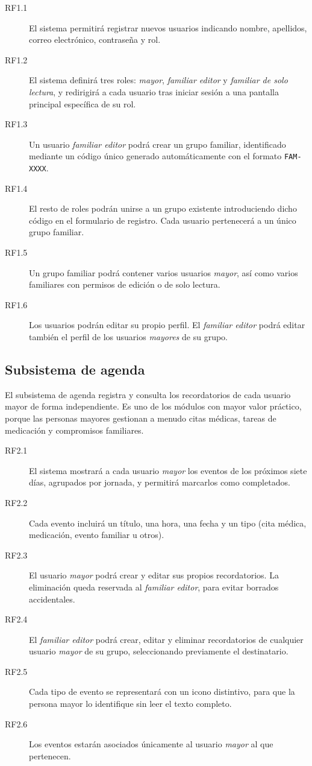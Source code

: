 \begin{description}
  \item[RF1.1] El sistema permitirá registrar nuevos usuarios indicando
  nombre, apellidos, correo electrónico, contraseña y rol.
  \item[RF1.2] El sistema definirá tres roles: \emph{mayor}, \emph{familiar
  editor} y \emph{familiar de solo lectura}, y redirigirá a cada usuario
  tras iniciar sesión a una pantalla principal específica de su rol.
  \item[RF1.3] Un usuario \emph{familiar editor} podrá crear un grupo
  familiar, identificado mediante un código único generado
  automáticamente con el formato \texttt{FAM-XXXX}.
  \item[RF1.4] El resto de roles podrán unirse a un grupo existente
  introduciendo dicho código en el formulario de registro. Cada usuario
  pertenecerá a un único grupo familiar.
  \item[RF1.5] Un grupo familiar podrá contener varios usuarios \emph{mayor},
  así como varios familiares con permisos de edición o de solo lectura.
  \item[RF1.6] Los usuarios podrán editar su propio perfil. El
  \emph{familiar editor} podrá editar también el perfil de los usuarios
  \emph{mayores} de su grupo.
\end{description}

\subsection{Subsistema de agenda\label{SUB:REQ_AGENDA}}

El subsistema de agenda registra y consulta los recordatorios de cada
usuario mayor de forma independiente. Es uno de los módulos con mayor
valor práctico, porque las personas mayores gestionan a menudo citas
médicas, tareas de medicación y compromisos familiares.

\begin{description}
  \item[RF2.1] El sistema mostrará a cada usuario \emph{mayor} los eventos
  de los próximos siete días, agrupados por jornada, y permitirá marcarlos
  como completados.
  \item[RF2.2] Cada evento incluirá un título, una hora, una fecha y un
  tipo (cita médica, medicación, evento familiar u otros).
  \item[RF2.3] El usuario \emph{mayor} podrá crear y editar sus propios
  recordatorios. La eliminación queda reservada al \emph{familiar editor},
  para evitar borrados accidentales.
  \item[RF2.4] El \emph{familiar editor} podrá crear, editar y eliminar
  recordatorios de cualquier usuario \emph{mayor} de su grupo,
  seleccionando previamente el destinatario.
  \item[RF2.5] Cada tipo de evento se representará con un icono distintivo,
  para que la persona mayor lo identifique sin leer el texto completo.
  \item[RF2.6] Los eventos estarán asociados únicamente al usuario
  \emph{mayor} al que pertenecen.
\end{description}

